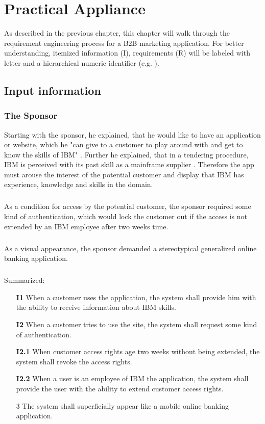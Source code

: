 \chapter{Practical Appliance}
As described in the previous chapter, this chapter will walk through the requirement engineering process for a B2B marketing application. For better understanding, itemized information (I), requirements (R) will be labeled with letter and a hierarchical numeric identifier (e.g. ).
\section{Input information}
\subsection{The Sponsor}
Starting with the sponsor, he explained, that he would like to have an application or website, which he "can give to a customer to play around with and get to know the skills of IBM" \parencite{Sachs.20.04.2017b}. Further he explained, that in a tendering procedure, IBM is perceived with its past skill as a mainframe supplier \parencite{Sachs.20.04.2017b}. Therefore the app must arouse the interest of the potential customer and display that IBM has experience, knowledge and skills in the domain. 

\paragraph{} As a condition for access by the potential customer, the sponsor required some kind of authentication, which would lock the customer out if the access is not extended by an IBM employee after two weeks time.

\paragraph{} As a visual appearance, the sponsor demanded a stereotypical generalized online banking application.

\paragraph{} Summarized:

\begin{itemize}
    \item [\textbf{I1}] When a customer uses the application, the system shall provide him with the ability to receive information about IBM skills.
    \item [\textbf{I2}] When a customer tries to use the site, the system shall request some kind of authentication.
    \item [\textbf{I2.1}] When customer access rights age two weeks without being extended, the system shall revoke the access rights.
    \item [\textbf{I2.2}\label{R2.2}] When a user is an employee of IBM the application, the system shall provide the user with the ability to extend customer access rights.
    \item [3] The system shall superficially appear like a mobile online banking application.
\end{itemize}

